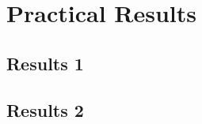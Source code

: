
\chapter{Practical Results}\label{chap:results}

\section{Results 1}\label{sec:results1}

\section{Results 2}\label{sec:results2}


